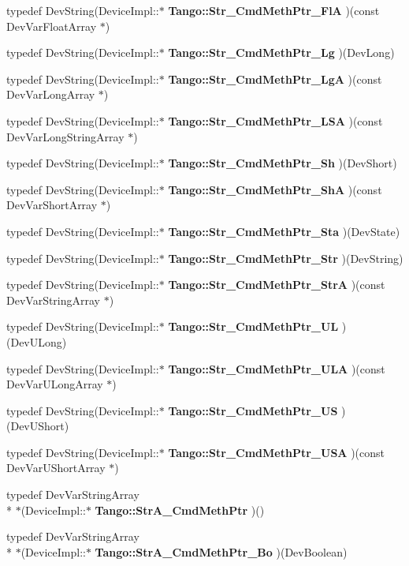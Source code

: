\begin{DoxyCompactItemize}
typedef Dev\-String(Device\-Impl\-::$\ast$ {\bf Tango\-::\-Str\-\_\-\-Cmd\-Meth\-Ptr\-\_\-\-Fl\-A} )(const Dev\-Var\-Float\-Array $\ast$)
\item 
typedef Dev\-String(Device\-Impl\-::$\ast$ {\bf Tango\-::\-Str\-\_\-\-Cmd\-Meth\-Ptr\-\_\-\-Lg} )(Dev\-Long)
\item 
typedef Dev\-String(Device\-Impl\-::$\ast$ {\bf Tango\-::\-Str\-\_\-\-Cmd\-Meth\-Ptr\-\_\-\-Lg\-A} )(const Dev\-Var\-Long\-Array $\ast$)
\item 
typedef Dev\-String(Device\-Impl\-::$\ast$ {\bf Tango\-::\-Str\-\_\-\-Cmd\-Meth\-Ptr\-\_\-\-L\-S\-A} )(const Dev\-Var\-Long\-String\-Array $\ast$)
\item 
typedef Dev\-String(Device\-Impl\-::$\ast$ {\bf Tango\-::\-Str\-\_\-\-Cmd\-Meth\-Ptr\-\_\-\-Sh} )(Dev\-Short)
\item 
typedef Dev\-String(Device\-Impl\-::$\ast$ {\bf Tango\-::\-Str\-\_\-\-Cmd\-Meth\-Ptr\-\_\-\-Sh\-A} )(const Dev\-Var\-Short\-Array $\ast$)
\item 
typedef Dev\-String(Device\-Impl\-::$\ast$ {\bf Tango\-::\-Str\-\_\-\-Cmd\-Meth\-Ptr\-\_\-\-Sta} )(Dev\-State)
\item 
typedef Dev\-String(Device\-Impl\-::$\ast$ {\bf Tango\-::\-Str\-\_\-\-Cmd\-Meth\-Ptr\-\_\-\-Str} )(Dev\-String)
\item 
typedef Dev\-String(Device\-Impl\-::$\ast$ {\bf Tango\-::\-Str\-\_\-\-Cmd\-Meth\-Ptr\-\_\-\-Str\-A} )(const Dev\-Var\-String\-Array $\ast$)
\item 
typedef Dev\-String(Device\-Impl\-::$\ast$ {\bf Tango\-::\-Str\-\_\-\-Cmd\-Meth\-Ptr\-\_\-\-U\-L} )(Dev\-U\-Long)
\item 
typedef Dev\-String(Device\-Impl\-::$\ast$ {\bf Tango\-::\-Str\-\_\-\-Cmd\-Meth\-Ptr\-\_\-\-U\-L\-A} )(const Dev\-Var\-U\-Long\-Array $\ast$)
\item 
typedef Dev\-String(Device\-Impl\-::$\ast$ {\bf Tango\-::\-Str\-\_\-\-Cmd\-Meth\-Ptr\-\_\-\-U\-S} )(Dev\-U\-Short)
\item 
typedef Dev\-String(Device\-Impl\-::$\ast$ {\bf Tango\-::\-Str\-\_\-\-Cmd\-Meth\-Ptr\-\_\-\-U\-S\-A} )(const Dev\-Var\-U\-Short\-Array $\ast$)
\item 
typedef Dev\-Var\-String\-Array \\*
$\ast$(Device\-Impl\-::$\ast$ {\bf Tango\-::\-Str\-A\-\_\-\-Cmd\-Meth\-Ptr} )()
\item 
typedef Dev\-Var\-String\-Array \\*
$\ast$(Device\-Impl\-::$\ast$ {\bf Tango\-::\-Str\-A\-\_\-\-Cmd\-Meth\-Ptr\-\_\-\-Bo} )(Dev\-Boolean)

\end{DoxyCompactItemize}
